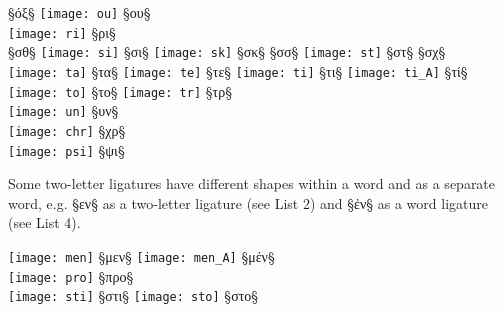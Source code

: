 \begin{liste}
{}   §{όξ}§ \quad
{} \texttt{[image: ou]} §{ου}§ \\

 \texttt{[image: ri]} §{ρι}§ \\

  §{σθ}§ \quad
\texttt{[image: si]} §{σι}§ \quad
\texttt{[image: sk]} §{σκ}§ \quad
{}  §{σσ}§ \quad
{} \texttt{[image: st]} §{στ}§ \quad
{} §{σχ}§ \\

\texttt{[image: ta]} §{τα}§ \quad
\texttt{[image: te]} §{τε}§ \quad
\texttt{[image: ti]} §{τι}§ \quad
\texttt{[image: ti\_A]} §{τί}§ \quad
\texttt{[image: to]} §{το}§ \quad
\texttt{[image: tr]} §{τρ}§ \\

 \texttt{[image: un]} §{υν}§ \\

 \texttt{[image: chr]} §{χρ}§ \\

\texttt{[image: psi]} §{ψι}§ \\

\end{liste}


\begin{note}
Some two-letter ligatures have different shapes within a word and as a separate word, e.g. §{εν}§ as a two-letter ligature (see List 2) and §{ἐν}§ as a word ligature (see List 4).
\end{note}


\begin{liste}

\texttt{[image: men]} §{μεν}§ \quad
\texttt{[image: men\_A]} §{μέν}§ \\

\texttt{[image: pro]} §{προ}§ \\

 \texttt{[image: sti]} §{στι}§ \quad
\texttt{[image: sto]} §{στο}§ \\

\end{liste}


